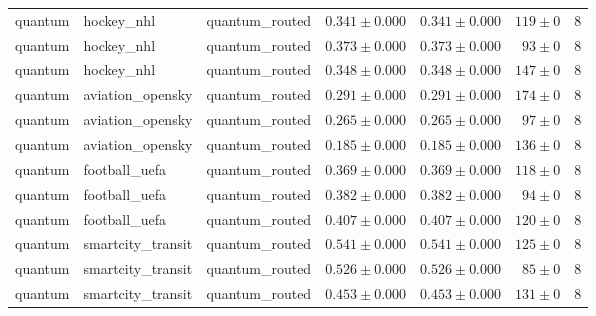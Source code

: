 \begin{table}[htbp]
\begin{tabular}{l l l r r r r}
quantum & hockey\_nhl & quantum\_routed & $0.341\pm0.000$ & $0.341\pm0.000$ & $119\pm0$ & 8 \\
quantum & hockey\_nhl & quantum\_routed & $0.373\pm0.000$ & $0.373\pm0.000$ & $93\pm0$ & 8 \\
quantum & hockey\_nhl & quantum\_routed & $0.348\pm0.000$ & $0.348\pm0.000$ & $147\pm0$ & 8 \\
quantum & aviation\_opensky & quantum\_routed & $0.291\pm0.000$ & $0.291\pm0.000$ & $174\pm0$ & 8 \\
quantum & aviation\_opensky & quantum\_routed & $0.265\pm0.000$ & $0.265\pm0.000$ & $97\pm0$ & 8 \\
quantum & aviation\_opensky & quantum\_routed & $0.185\pm0.000$ & $0.185\pm0.000$ & $136\pm0$ & 8 \\
quantum & football\_uefa & quantum\_routed & $0.369\pm0.000$ & $0.369\pm0.000$ & $118\pm0$ & 8 \\
quantum & football\_uefa & quantum\_routed & $0.382\pm0.000$ & $0.382\pm0.000$ & $94\pm0$ & 8 \\
quantum & football\_uefa & quantum\_routed & $0.407\pm0.000$ & $0.407\pm0.000$ & $120\pm0$ & 8 \\
quantum & smartcity\_transit & quantum\_routed & $0.541\pm0.000$ & $0.541\pm0.000$ & $125\pm0$ & 8 \\
quantum & smartcity\_transit & quantum\_routed & $0.526\pm0.000$ & $0.526\pm0.000$ & $85\pm0$ & 8 \\
quantum & smartcity\_transit & quantum\_routed & $0.453\pm0.000$ & $0.453\pm0.000$ & $131\pm0$ & 8 \\
\hline
\end{tabular}
\end{table}
